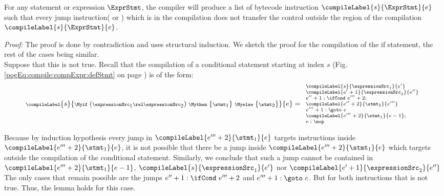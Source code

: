 \begin{compPropApp}\label{compile:prop:compProp1}

    For any statement or expression $\ExprStmt $,  
    the compiler will produce a list of bytecode instruction $\compileLabel{s}{\ExprStmt}{e}$ such that every jump instruction(\goto {} or \ifCond) which is in the compilation 
    does not transfer the control outside the region of the compilation  $\compileLabel{s}{\ExprStmt}{e}$.

\end{compPropApp}
\textit{Proof:} 
The proof is done by contradiction and uses structural induction. 
We sketch the proof for the compilation of the if statement, the rest of the cases being similar. \\
Suppose that this is not true.
Recall that the compilation of a conditional statement starting at index $s$  
(Fig. \ref{pogEq:compile:compExpr:defStmt} on page \pageref{pogEq:compile:compExpr:defStmt}) is of the form:
$${\scriptsize \compileLabel{s}{ \Myif \ ( \expressionSrc_1 \rel \expressionSrc_2 ) \ \Mythen \ \{ \stmt_1 \}  \  \Myelse \ \{ \stmt_2 \}   }{e}= 
\begin{array}{l}
\compileLabel{s}{\expressionSrc_1}{e'} \\
\compileLabel{e'+1}{\expressionSrc_2}{e''}\\ 
 e'' + 1: \ifCond \ e''' + 2; \\
 \compileLabel{e'' + 2}{\stmt_2}{e'''}\\
 e''' + 1: \goto \ e\\  
\compileLabel{e''' +  2}{\stmt_1}{ e -1 };\\
 e : \nop
\end{array}}
		    $$
 
Because by induction hypothesis every jump in  $\compileLabel{e''' +  2}{\stmt_1}{ e} $ targets  instructions inside $\compileLabel{e''' +  2}{\stmt_1}{ e} $,
 it  is not possible that there be  a jump  inside 
$\compileLabel{e''' +  2}{\stmt_1}{ e} $  which targets outside the compilation of the conditional statement.
 Similarly, we conclude that such a  jump cannot be contained in 
$\compileLabel{e''' +  2}{\stmt_1}{ e -1  } $, $ \compileLabel{s}{\expressionSrc_1}{e'}$ nor $\compileLabel{e'+1}{\expressionSrc_2}{e''}$
The only cases that remain possible are the  jumps  $ e'' + 1: \ifCond \ e''' + 2 $  and $ e''' + 1: \goto \ e  $.
 But for both instructions that is not true. Thus, the lemma holds for this case.


